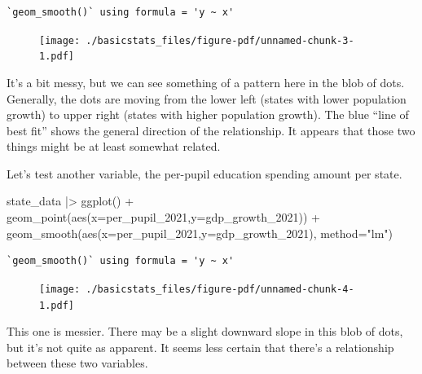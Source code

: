 \documentclass[
  letterpaper,
  DIV=11,
  numbers=noendperiod]{scrreprt}
\newenvironment{Shaded}{\begin{snugshade}}{\end{snugshade}}
\newcommand{\AttributeTok}[1]{\textcolor[rgb]{0.40,0.45,0.13}{#1}}
\newcommand{\FunctionTok}[1]{\textcolor[rgb]{0.28,0.35,0.67}{#1}}
\newcommand{\NormalTok}[1]{\textcolor[rgb]{0.00,0.23,0.31}{#1}}
\newcommand{\SpecialCharTok}[1]{\textcolor[rgb]{0.37,0.37,0.37}{#1}}
\newcommand{\StringTok}[1]{\textcolor[rgb]{0.13,0.47,0.30}{#1}}
\begin{document}
\begin{verbatim}
`geom_smooth()` using formula = 'y ~ x'
\end{verbatim}

\begin{figure}[H]

{\centering \texttt{[image: ./basicstats\_files/figure-pdf/unnamed-chunk-3-1.pdf]}

}

\end{figure}

It's a bit messy, but we can see something of a pattern here in the blob
of dots. Generally, the dots are moving from the lower left (states with
lower population growth) to upper right (states with higher population
growth). The blue ``line of best fit'' shows the general direction of
the relationship. It appears that those two things might be at least
somewhat related.

Let's test another variable, the per-pupil education spending amount per
state.

\begin{Shaded}
\begin{Highlighting}[]
\NormalTok{state\_data }\SpecialCharTok{|\textgreater{}}
  \FunctionTok{ggplot}\NormalTok{() }\SpecialCharTok{+}
  \FunctionTok{geom\_point}\NormalTok{(}\FunctionTok{aes}\NormalTok{(}\AttributeTok{x=}\NormalTok{per\_pupil\_2021,}\AttributeTok{y=}\NormalTok{gdp\_growth\_2021)) }\SpecialCharTok{+}
  \FunctionTok{geom\_smooth}\NormalTok{(}\FunctionTok{aes}\NormalTok{(}\AttributeTok{x=}\NormalTok{per\_pupil\_2021,}\AttributeTok{y=}\NormalTok{gdp\_growth\_2021), }\AttributeTok{method=}\StringTok{"lm"}\NormalTok{)}
\end{Highlighting}
\end{Shaded}

\begin{verbatim}
`geom_smooth()` using formula = 'y ~ x'
\end{verbatim}

\begin{figure}[H]

{\centering \texttt{[image: ./basicstats\_files/figure-pdf/unnamed-chunk-4-1.pdf]}

}

\end{figure}

This one is messier. There may be a slight downward slope in this blob
of dots, but it's not quite as apparent. It seems less certain that
there's a relationship between these two variables.
\end{document}

